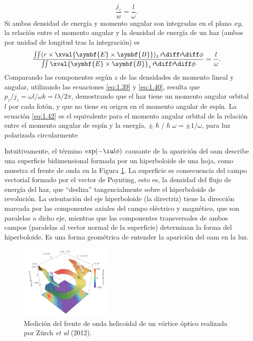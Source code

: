 \begin{equation}\label{eq:.1.41}
  \frac{j_{z}}{w} = \frac{l}{\omega}.
\end{equation}
Si ambas densidad de energía y momento angular son integradas en el plano $xy$, la relación entre el momento angular y la densidad de energía de un haz (ambos por unidad de longitud tras la integración) es
\begin{equation}\label{eq:1.42}
  \frac{\iint(r \times \xval{\symbf{E}\times \symbf{B}})_{z}\, r\!\diff r\!\diff \phi}{\iint \xval{\symbf{E}\times \symbf{B}}_{z}\, r\!\diff r\!\diff \phi} = \frac{l}{\omega}.
\end{equation}
Comparando las componentes según $z$ de las densidades de momento lineal y angular, utilizando las ecuaciones \eqref{eq:1.39} y \eqref{eq:1.40}, resulta que $p_{z}/j_{z}=\omega l /\omega k = l \lambda/2 \pi$, demostrando que el haz tiene un momento angular orbital $l$ por cada fotón, y que no tiene su origen en el momento angular de espín. La ecuación \eqref{eq:1.42} es el equivalente para el momento angular orbital de la relación entre el momento angular de espín y la energía, $\pm \hslash /\hslash \omega = \pm 1/\omega$, para luz polarizada circularmente

Intuitivamente, el término $\exp(- \iu l \phi)$ causante de la aparición del \acrshort{oam} describe una superficie bidimensional formada por un hiperboloide de una hoja, como muestra el frente de onda en la Figura \ref{fig:1.15}. La superficie es consecuencia del campo vectorial formado por el vector de Poynting, esto es, la densidad del flujo de energía del haz, que \enquote{desliza} tangencialmente sobre el hiperboloide de revolución. La orientación del eje hiperboloide (la directriz) tiene la dirección marcada por las componentes axiales del campo eléctrico y magnético, que son paralelas a dicho eje, mientras que las componentes transversales de ambos campos (paralelas al vector normal de la superficie) determinan la forma del hiperboloide. Es una forma geométrica de entender la aparición del \acrshort{oam} en la luz.

\begin{figure}[htbp]
  \centering
  \includegraphics[width=0.4\textwidth]{Figuras/ch1_helicoidal.png}
  \caption{Medición del frente de onda helicoidal de un vórtice óptico realizada por Zürch \emph{et al} (2012)\autocite{Zurch2012}.}
  \label{fig:1.15}
\end{figure}

